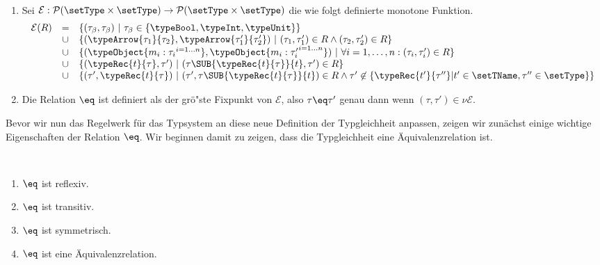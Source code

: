 \begin{definition} \label{definition:Lort:Typgleichheit} \
  \begin{enumerate}
    \item Sei $\mathcal{E}: \mathcal{P}(\setType\times\setType) \to \mathcal{P}(\setType\times\setType)$ die
          wie folgt definierte monotone Funktion.
          \[\begin{array}{rcl}
            \mathcal{E}(R) & =  & \{(\tau_\beta,\tau_\beta)\ |\ \tau_\beta \in \{\typeBool,\typeInt,\typeUnit\}\} \\
                  &\cup& \{(\typeArrow{\tau_1}{\tau_2},\typeArrow{\tau_1'}{\tau_2'})\ |\ (\tau_1,\tau_1')\in R \wedge
                           (\tau_2,\tau_2')\in R\} \\
                  &\cup& \{(\typeObject{{m_i:\tau_i}^{i=1 \ldots n}},\typeObject{{m_i:\tau_i'}^{i=1 \ldots n}})\ |\ 
                           \forall i=1,\ldots,n:(\tau_i,\tau_i')\in R\} \\
                  &\cup& \{(\typeRec{t}{\tau},\tau')\ |\ (\tau\SUB{\typeRec{t}{\tau}}{t},\tau')\in R\} \\
                  &\cup& \{(\tau',\typeRec{t}{\tau})\ |\ (\tau',\tau\SUB{\typeRec{t}{\tau}}{t})\in R \wedge
                           \tau'\not\in\{\typeRec{t'}{\tau''}|t'\in\setTName,\tau''\in\setType\}\}
          \end{array}\]

    \item Die Relation $\eq$ ist definiert als der gr\"o"ste Fixpunkt von $\mathcal{E}$, also $\tau \eq \tau'$ genau
          dann wenn $(\tau,\tau')\in\nu \mathcal{E}$.
  \end{enumerate}
\end{definition}

Bevor wir nun das Regelwerk f\"ur das Typsystem an diese neue Definition der Typgleichheit anpassen, zeigen
wir zun\"achst einige wichtige Eigenschaften der Relation $\eq$. Wir beginnen damit zu zeigen, dass die
Typgleichheit eine \"Aquivalenzrelation ist.

\begin{lemma} \
  \begin{enumerate}
    \item $\eq$ ist reflexiv.
    \item $\eq$ ist transitiv.
    \item $\eq$ ist symmetrisch.
    \item $\eq$ ist eine \"Aquivalenzrelation.
  \end{enumerate}
\end{lemma}

